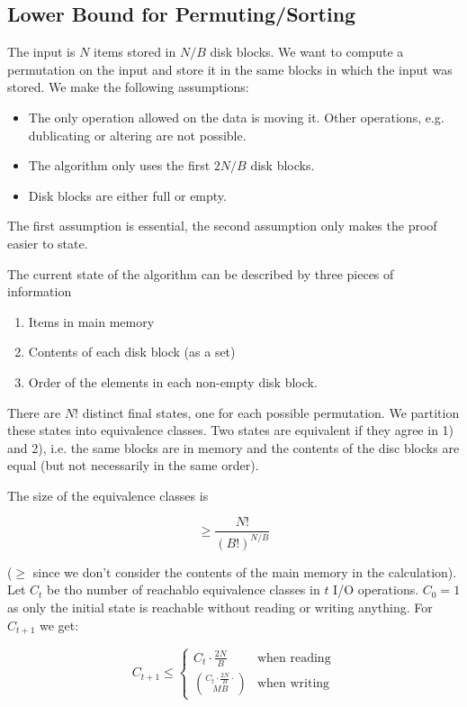 \subsection{Lower Bound for Permuting/Sorting}

The input is $N$ items stored in $N/B$ disk blocks. We want to compute a permutation on the input and store it in the same blocks in which the input was stored. We make the following assumptions:

\begin{itemize}
\item The only operation allowed on the data is moving it. Other operations, e.g. dublicating or altering are not possible.
\item The algorithm only uses the first $2N/B$ disk blocks.
\item Disk blocks are either full or empty.
\end{itemize}

The first assumption is essential, the second assumption only makes the proof easier to state.

The current state of the algorithm can be described by three pieces of information

\begin{enumerate}
\item Items in main memory
\item Contents of each disk block (as a set)
\item Order of the elements in each non-empty disk block.
\end{enumerate}

There are $N!$ distinct final states, one for each possible permutation. We partition these states into equivalence classes. Two states are equivalent if they agree in 1) and 2), i.e. the same blocks are in memory and the contents of the disc blocks are equal (but not necessarily in the same order).

The size of the equivalence classes is

\[\geq \frac{N!}{(B!)^{N/B}}\]

($\geq$ since we don't consider the contents of the main memory in the calculation). Let $C_t$ be tho number of reachablo equivalence classes in $t$ I/O operations. $C_0=1$ as only the initial state is reachable without reading or writing anything. For $C_{t+1}$ we get:

\[C_{t+1} \leq \begin{cases}
C_t \cdot \frac{2N}{B}	& \text{when reading}\\
C_t \cdot \frac{2N}{B} \cdot \choose{M}{B}	& \text{when writing}
\end{cases}\]

